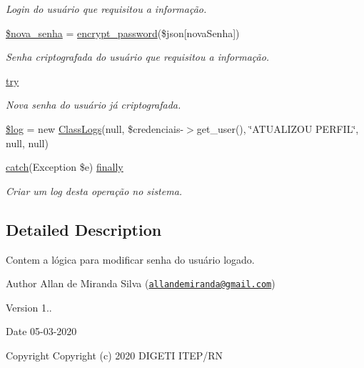 \begin{DoxyCompactItemize}
\begin{DoxyCompactList}\small\item\em Login do usuário que requisitou a informação. \end{DoxyCompactList}\item 
\hyperlink{formulario_8php_aab85c4ba1c96b0ff4b909aa956efd450}{\$nova\+\_\+senha} = \hyperlink{_header_8php_a5455ea8d21f7611dae58e3d4612fb3bd}{encrypt\+\_\+password}(\$json\mbox{[}\textquotesingle{}nova\+Senha\textquotesingle{}\mbox{]})
\begin{DoxyCompactList}\small\item\em Senha criptografada do usuário que requisitou a informação. \end{DoxyCompactList}\item 
\hyperlink{formulario_8php_abe4cc9788f52e49485473dc699537388}{try}
\begin{DoxyCompactList}\small\item\em Nova senha do usuário já criptografada. \end{DoxyCompactList}\item 
\hyperlink{formulario_8php_a9a2cf15a653aee8be437f7ae474cd494}{\$log} = new \hyperlink{class_class_logs}{Class\+Logs}(null, \$credenciais-\/$>$get\+\_\+user(), \char`\"{}A\+T\+U\+A\+L\+I\+Z\+OU P\+E\+R\+F\+IL\char`\"{}, null, null)
\item 
\hyperlink{imprimir_2ficha_2index_8php_a8104793004944f01dd070fc8b1ade3c4}{catch}(Exception \$e) \hyperlink{formulario_8php_a1eb47d68a4a4f73debf91b15e179d813}{finally}
\begin{DoxyCompactList}\small\item\em Criar um log desta operação no sistema. \end{DoxyCompactList}\end{DoxyCompactItemize}


\subsection{Detailed Description}
Contem a lógica para modificar senha do usuário logado. 

\begin{DoxyAuthor}{Author}
Allan de Miranda Silva (\href{mailto:allandemiranda@gmail.com}{\tt allandemiranda@gmail.\+com}) 
\end{DoxyAuthor}
\begin{DoxyVersion}{Version}
1.. 
\end{DoxyVersion}
\begin{DoxyDate}{Date}
05-\/03-\/2020
\end{DoxyDate}
\begin{DoxyCopyright}{Copyright}
Copyright (c) 2020 D\+I\+G\+E\+TI I\+T\+E\+P/\+RN 
\end{DoxyCopyright}


